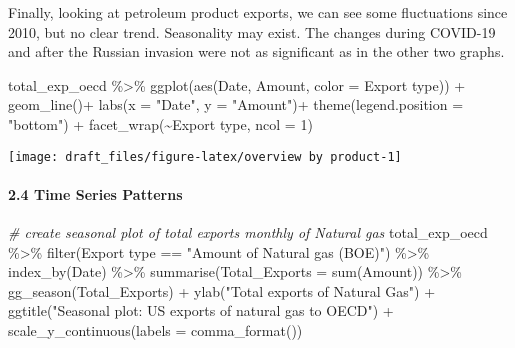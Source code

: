 \documentclass[
]{article}
\newenvironment{Shaded}{\begin{snugshade}}{\end{snugshade}}
\newcommand{\AttributeTok}[1]{\textcolor[rgb]{0.77,0.63,0.00}{#1}}
\newcommand{\CommentTok}[1]{\textcolor[rgb]{0.56,0.35,0.01}{\textit{#1}}}
\newcommand{\DecValTok}[1]{\textcolor[rgb]{0.00,0.00,0.81}{#1}}
\newcommand{\FunctionTok}[1]{\textcolor[rgb]{0.00,0.00,0.00}{#1}}
\newcommand{\NormalTok}[1]{#1}
\newcommand{\SpecialCharTok}[1]{\textcolor[rgb]{0.00,0.00,0.00}{#1}}
\newcommand{\StringTok}[1]{\textcolor[rgb]{0.31,0.60,0.02}{#1}}
\begin{document}
Finally, looking at petroleum product exports, we can see some
fluctuations since 2010, but no clear trend. Seasonality may exist. The
changes during COVID-19 and after the Russian invasion were not as
significant as in the other two graphs.

\begin{Shaded}
\begin{Highlighting}[]
\NormalTok{total\_exp\_oecd }\SpecialCharTok{\%\textgreater{}\%}  
  \FunctionTok{ggplot}\NormalTok{(}\FunctionTok{aes}\NormalTok{(Date, Amount, }\AttributeTok{color =} \StringTok{\textasciigrave{}}\AttributeTok{Export type}\StringTok{\textasciigrave{}}\NormalTok{)) }\SpecialCharTok{+}
  \FunctionTok{geom\_line}\NormalTok{()}\SpecialCharTok{+}
  \FunctionTok{labs}\NormalTok{(}\AttributeTok{x =} \StringTok{"Date"}\NormalTok{, }\AttributeTok{y =} \StringTok{"Amount"}\NormalTok{)}\SpecialCharTok{+}
  \FunctionTok{theme}\NormalTok{(}\AttributeTok{legend.position =} \StringTok{"bottom"}\NormalTok{) }\SpecialCharTok{+}
  \FunctionTok{facet\_wrap}\NormalTok{(}\SpecialCharTok{\textasciitilde{}}\StringTok{\textasciigrave{}}\AttributeTok{Export type}\StringTok{\textasciigrave{}}\NormalTok{, }\AttributeTok{ncol =} \DecValTok{1}\NormalTok{)}
\end{Highlighting}
\end{Shaded}

\begin{center}\texttt{[image: draft\_files/figure-latex/overview by product-1]} \end{center}

\hypertarget{time-series-patterns}{%
\paragraph{2.4 Time Series Patterns}\label{time-series-patterns}}

\begin{Shaded}
\begin{Highlighting}[]
\CommentTok{\# create seasonal plot of total exports monthly of Natural gas}
\NormalTok{total\_exp\_oecd }\SpecialCharTok{\%\textgreater{}\%} \FunctionTok{filter}\NormalTok{(}\StringTok{\textasciigrave{}}\AttributeTok{Export type}\StringTok{\textasciigrave{}} \SpecialCharTok{==} \StringTok{"Amount of Natural gas (BOE)"}\NormalTok{) }\SpecialCharTok{\%\textgreater{}\%} 
  \FunctionTok{index\_by}\NormalTok{(Date) }\SpecialCharTok{\%\textgreater{}\%} 
  \FunctionTok{summarise}\NormalTok{(}\AttributeTok{Total\_Exports =} \FunctionTok{sum}\NormalTok{(}\StringTok{\textasciigrave{}}\AttributeTok{Amount}\StringTok{\textasciigrave{}}\NormalTok{)) }\SpecialCharTok{\%\textgreater{}\%} 
  \FunctionTok{gg\_season}\NormalTok{(Total\_Exports) }\SpecialCharTok{+}
  \FunctionTok{ylab}\NormalTok{(}\StringTok{"Total exports  of Natural Gas"}\NormalTok{) }\SpecialCharTok{+}
  \FunctionTok{ggtitle}\NormalTok{(}\StringTok{"Seasonal plot: US exports of natural gas to OECD"}\NormalTok{) }\SpecialCharTok{+}
  \FunctionTok{scale\_y\_continuous}\NormalTok{(}\AttributeTok{labels =} \FunctionTok{comma\_format}\NormalTok{())}
\end{Highlighting}
\end{Shaded}
\end{document}
